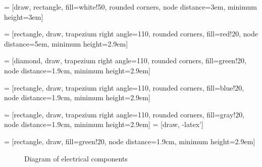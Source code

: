  = [draw, rectangle, fill=white!50, rounded corners, node distance=3em, minimum height=3em]

 = [rectangle, draw, trapezium right angle=110, rounded corners,
                  fill=red!20, node distance=5em, minimum height=2.9em]

 = [diamond, draw, trapezium right angle=110, rounded corners,
                  fill=green!20, node distance=1.9cm, minimum height=2.9em]

 = [rectangle, draw, trapezium right angle=110, rounded corners,
                  fill=blue!20, node distance=1.9cm, minimum height=2.9em]

 = [rectangle, draw, trapezium right angle=110, rounded corners,
                  fill=gray!20, node distance=1.9cm, minimum height=2.9em]
 = [draw, -latex']

 = [rectangle, draw, fill=green!20, node distance=1.9cm, minimum height=2.9em]

    
    \begin{figure}
        \begin{center}
\end{center}
\caption{Diagram of electrical components}
\end{figure}

